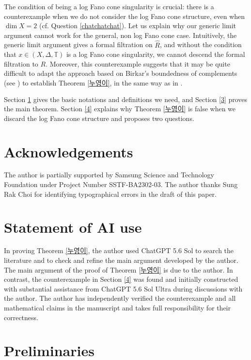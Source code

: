 \documentclass[a4paper,12pt]{amsart}
\theoremstyle{definition} %
\theoremstyle{remark}
\numberwithin{equation}{section}
\begin{document}
\smallskip

The condition of being a log Fano cone singularity is crucial: there is a counterexample when we do not consider the log Fano cone structure, even when $\dim X=2$ (cf. Question \ref{chatchatchat}). Let us explain why our generic limit argument cannot work for the general, non log Fano cone case. Intuitively, the generic limit argument gives a formal filtration on $\widehat{R}$, and without the condition that $x\in (X,\Delta,\mathbb{T})$ is a log Fano cone singularity, we cannot descend the formal filtration to $R$. Moreover, this counterexample suggests that it may be quite difficult to adapt the approach based on Birkar’s boundedness of complements (see \cite{Bir19}) to establish Theorem \ref{누영이}, in the same way as in \cite{Xu20, BLX22, BLXZ23}.

\smallskip

Section \ref{2} gives the basic notations and definitions we need, and Section \ref{3} proves the main theorem. Section \ref{4} explains why Theorem \ref{누영이} is false when we discard the log Fano cone structure and proposes two questions.

\section*{Acknowledgements}
The author is partially supported by Samsung Science and Technology Foundation under Project Number SSTF-BA2302-03. The author thanks Sung Rak Choi for identifying typographical errors in the draft of this paper.

\section*{Statement of AI use}
In proving Theorem \ref{누영이}, the author used ChatGPT 5.6 Sol to search the literature and to check and refine the main argument developed by the author. The main argument of the proof of Theorem \ref{누영이} is due to the author. In contrast, the counterexample in Section \ref{4} was found and initially constructed with substantial assistance from ChatGPT 5.6 Sol Ultra during discussions with the author. The author has independently verified the counterexample and all mathematical claims in the manuscript and takes full responsibility for their correctness.

\section{Preliminaries} \label{2}
\end{document}
